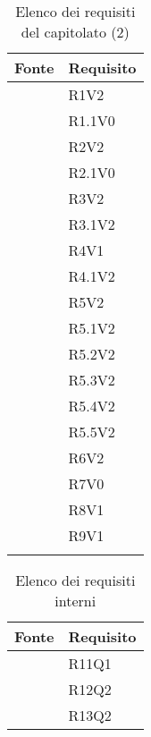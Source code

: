 		\begin{table}[H]
			\centering
			{\def\arraystretch{1.4}
			\begin{tabularx}{\textwidth}{YY}
				\textbf{Fonte} & \textbf{Requisito} \\
				\toprule
		         & R1V2 \\
				 & R1.1V0 \\
				 & R2V2 \\
				 & R2.1V0 \\
				 & R3V2 \\
				 & R3.1V2 \\
				 & R4V1 \\
				 & R4.1V2 \\
				 & R5V2 \\
				 & R5.1V2 \\
				 & R5.2V2 \\
				 & R5.3V2 \\
				 & R5.4V2 \\
				 & R5.5V2 \\
				 & R6V2 \\
				 & R7V0 \\
				 & R8V1 \\
				  & R9V1 \\
				\bottomrule\\
			\end{tabularx}}
			\caption{Elenco dei requisiti del capitolato (2)}
		\end{table}
	    
		\begin{table}[H]
			\centering
			{\def\arraystretch{1.5}
				\begin{tabularx}{\textwidth}{YY}
					\textbf{Fonte} & \textbf{Requisito} \\
					\toprule
					 & R11Q1 \\
					 & R12Q2 \\
					  & R13Q2 \\
					\bottomrule
				\end{tabularx}}
			\caption{Elenco dei requisiti interni}
		\end{table}

